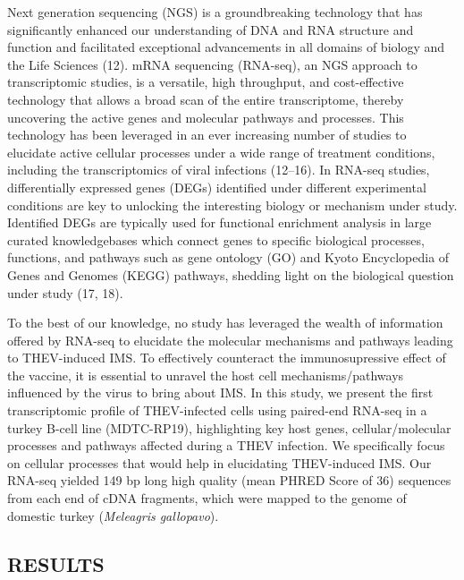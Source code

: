 \documentclass[
]{article}
\begin{document}
Next generation sequencing (NGS) is a groundbreaking technology that has
significantly enhanced our understanding of DNA and RNA structure and
function and facilitated exceptional advancements in all domains of
biology and the Life Sciences (12). mRNA sequencing (RNA-seq), an NGS
approach to transcriptomic studies, is a versatile, high throughput, and
cost-effective technology that allows a broad scan of the entire
transcriptome, thereby uncovering the active genes and molecular
pathways and processes. This technology has been leveraged in an ever
increasing number of studies to elucidate active cellular processes
under a wide range of treatment conditions, including the
transcriptomics of viral infections (12--16). In RNA-seq studies,
differentially expressed genes (DEGs) identified under different
experimental conditions are key to unlocking the interesting biology or
mechanism under study. Identified DEGs are typically used for functional
enrichment analysis in large curated knowledgebases which connect genes
to specific biological processes, functions, and pathways such as gene
ontology (GO) and Kyoto Encyclopedia of Genes and Genomes (KEGG)
pathways, shedding light on the biological question under study (17,
18).

To the best of our knowledge, no study has leveraged the wealth of
information offered by RNA-seq to elucidate the molecular mechanisms and
pathways leading to THEV-induced IMS. To effectively counteract the
immunosupressive effect of the vaccine, it is essential to unravel the
host cell mechanisms/pathways influenced by the virus to bring about
IMS. In this study, we present the first transcriptomic profile of
THEV-infected cells using paired-end RNA-seq in a turkey B-cell line
(MDTC-RP19), highlighting key host genes, cellular/molecular processes
and pathways affected during a THEV infection. We specifically focus on
cellular processes that would help in elucidating THEV-induced IMS. Our
RNA-seq yielded 149 bp long high quality (mean PHRED Score of 36)
sequences from each end of cDNA fragments, which were mapped to the
genome of domestic turkey (\emph{Meleagris gallopavo}). \newpage

\subsection{RESULTS}\label{results}
\end{document}
